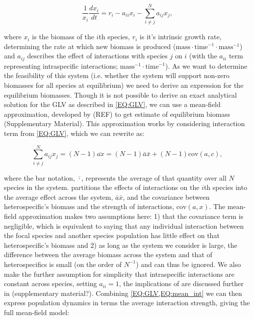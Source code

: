 \documentclass{article}
\begin{document}
\begin{equation} \label{EQ:GLV}
  \frac{1}{x_i} \frac{dx_i}{dt} = r_i - a_{ii} x_i - \sum^N_{i \neq j} a_{ij} x_j, 
\end{equation}

where $x_i$ is the biomass of the $i$th species, $r_i$ is it's intrinsic growth rate, determining the rate at which new biomass is produced ($\text{mass} \cdot \text{time}^{-1} \cdot \text{mass}^{-1} $) and $a_{ij}$ describes the effect of interactions with species $j$ on $i$ (with the $a_{ii}$ term representing intraspecific interactions; $\text{mass}^{-1} \cdot \text{time}^{-1}$). As we want to determine the feasibility of this system (i.e. whether the system will support non-zero biomasses for all species at equilibrium) we need to derive an expression for the equilibrium biomasses. Though it is not possible to derive an exact analytical solution for the GLV as described in \cref{EQ:GLV}, we can use a mean-field approximation, developed by (REF) to get estimate of equilibrium biomass (Supplementary Material). This approximation works by considering interaction term from \cref{EQ:GLV}, which we can rewrite as:

\begin{equation} \label{EQ:mean_int} 
    \sum^N_{i \neq j} a_{ij} x_j = (N-1) \bar{a x} = (N-1) \bar{a} \bar{x} + (N-1) \text{cov}(a,c),
\end{equation}

where the bar notation, $\bar{\cdot}$, represents the average of that quantity over all $N$ species in the system.  partitions the effects of interactions on the $i$th species into the average effect across the system, $\bar{a} \bar{x}$, and the covariance between heterospecific's biomass and the strength of interactions, $\text{cov}(a,x)$. The mean-field approximation makes two assumptions here: 1) that the covariance term is negligible, which is equivalent to saying that any individual interaction between the focal species and another species population has little effect on that heterospecific's biomass and 2) as long as the system we consider is large, the difference between the average biomass across the system and that of heterospecifics is small (on the order of $N^{-1}$) and can thus be ignored. We also make the further assumption for simplicity that intraspecific interactions are constant across species, setting $a_{ii} = 1$, the implications of are discussed further in (supplementary material?). Combining \cref{EQ:GLV,EQ:mean_int}  we can then express population dynamics in terms the average interaction strength, giving the full mean-field model:
\end{document}
